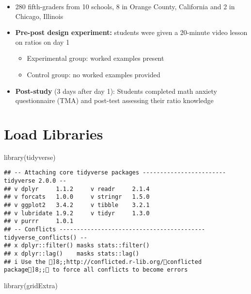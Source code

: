 \documentclass[
]{article}
\newenvironment{Shaded}{\begin{snugshade}}{\end{snugshade}}
\newcommand{\FunctionTok}[1]{\textcolor[rgb]{0.00,0.00,0.00}{#1}}
\newcommand{\NormalTok}[1]{#1}
\begin{document}
\begin{itemize}
\item
  280 fifth-graders from 10 schools, 8 in Orange County, California and
  2 in Chicago, Illinois
\item
  \textbf{Pre-post design experiment:} students were given a 20-minute
  video lesson on ratios on day 1

  \begin{itemize}
  \item
    Experimental group: worked examples present
  \item
    Control group: no worked examples provided
  \end{itemize}
\item
  \textbf{Post-study} (3 days after day 1): Students completed math
  anxiety questionnaire (TMA) and post-test assessing their ratio
  knowledge
\end{itemize}

\hypertarget{load-libraries}{%
\section{Load Libraries}\label{load-libraries}}

\begin{Shaded}
\begin{Highlighting}[]
\FunctionTok{library}\NormalTok{(tidyverse)}
\end{Highlighting}
\end{Shaded}

\begin{verbatim}
## -- Attaching core tidyverse packages ------------------------ tidyverse 2.0.0 --
## v dplyr     1.1.2     v readr     2.1.4
## v forcats   1.0.0     v stringr   1.5.0
## v ggplot2   3.4.2     v tibble    3.2.1
## v lubridate 1.9.2     v tidyr     1.3.0
## v purrr     1.0.1     
## -- Conflicts ------------------------------------------ tidyverse_conflicts() --
## x dplyr::filter() masks stats::filter()
## x dplyr::lag()    masks stats::lag()
## i Use the ]8;;http://conflicted.r-lib.org/conflicted package]8;; to force all conflicts to become errors
\end{verbatim}

\begin{Shaded}
\begin{Highlighting}[]
\FunctionTok{library}\NormalTok{(gridExtra)}
\end{Highlighting}
\end{Shaded}
\end{document}
